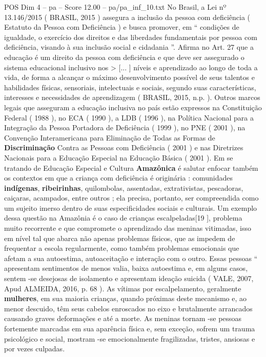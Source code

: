 \begin{textsample}{POS Dim 4 – pa – Score 12.00 – pa/pa\_inf\_10.txt}
No Brasil, a Lei nº 13.146/2015 ( BRASIL, 2015 ) assegura a inclusão da pessoa com deficiência ( Estatuto da Pessoa com Deficiência ) e busca promover, em “ condições de igualdade, o exercício dos direitos e das liberdades fundamentais por pessoa com deficiência, visando à sua inclusão social e cidadania ”.
Afirma no Art. 27 que a educação é um direito da pessoa com deficiência e que deve ser assegurado o sistema educacional inclusivo nos > [... ] níveis e aprendizado ao longo de toda a vida, de forma a alcançar o máximo desenvolvimento possível de seus talentos e habilidades físicas, sensoriais, intelectuais e sociais, segundo suas características, interesses e necessidades de aprendizagem ( BRASIL, 2015, n.p. ).
Outros marcos legais que asseguram a educação inclusiva no país estão expressos na Constituição Federal ( 1988 ), no ECA ( 1990 ), a LDB ( 1996 ), na Política Nacional para a Integração da Pessoa Portadora de Deficiência ( 1999 ), no PNE ( 2001 ), na Convenção Interamericana para Eliminação de Todas as Formas de \textbf{Discriminação} Contra as Pessoas com Deficiência ( 2001 ) e nas Diretrizes Nacionais para a Educação Especial na Educação Básica ( 2001 ).
Em se tratando de Educação Especial e Cultura \textbf{Amazônica} é salutar enfocar também os contextos em que a criança com deficiência é originária : comunidades \textbf{indígenas}, \textbf{ribeirinhas}, quilombolas, assentadas, extrativistas, pescadoras, caiçaras, acampados, entre outros ; ela precisa, portanto, ser compreendida como um sujeito imerso dentro de suas especificidades sociais e culturais.
Um exemplo dessa questão na Amazônia é o caso de crianças escalpeladas[19 ], problema muito recorrente e que compromete o aprendizado das meninas vitimadas, isso em nível tal que abarca não apenas problemas físicos, que as impedem de frequentar a escola regularmente, como também problemas emocionais que afetam a sua autoestima, autoaceitação e interação com o outro.
Essas pessoas “ apresentam sentimentos de menos valia, baixa autoestima e, em alguns casos, sentem -se desejosas de isolamento e apresentam ideação suicida ( VALE, 2007, Apud ALMEIDA, 2016, p. 68 ).
As vítimas por escalpelamento, geralmente \textbf{mulheres}, em sua maioria crianças, quando próximas deste mecanismo e, ao menor descuido, têm seus cabelos enroscados no eixo e brutalmente arrancados causando graves deformações e até a morte.
As meninas tornam -se pessoas fortemente marcadas em sua aparência física e, sem exceção, sofrem um trauma psicológico e social, mostram -se emocionalmente fragilizadas, tristes, ansiosas e por vezes culpadas.

\end{textsample}
